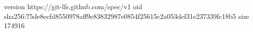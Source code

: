 version https://git-lfs.github.com/spec/v1
oid sha256:75de8ecfd8550978aff9e83832987e0854f25615c2a053def31e237339fc18b5
size 174916
